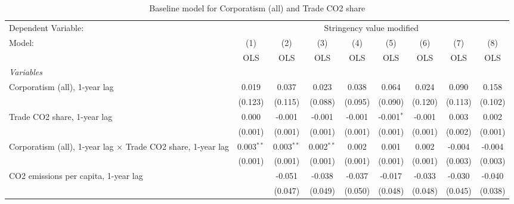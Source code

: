 
\begin{table}[htbp]
   \caption{Baseline model for Corporatism (all) and Trade CO2 share}
   \centering
   \begin{tabular}{lcccccccc}
      \toprule
      Dependent Variable: & \multicolumn{8}{c}{Stringency value modified}\\
      Model:                                                              & (1)          & (2)          & (3)          & (4)     & (5)          & (6)           & (7)           & (8)\\  
                                                                          &  OLS         & OLS          & OLS          & OLS     & OLS          & OLS           & OLS           & OLS\\  
      \midrule
      \emph{Variables}\\
      Corporatism (all), 1-year lag                                       & 0.019        & 0.037        & 0.023        & 0.038   & 0.064        & 0.024         & 0.090         & 0.158\\   
                                                                          & (0.123)      & (0.115)      & (0.088)      & (0.095) & (0.090)      & (0.120)       & (0.113)       & (0.102)\\   
      Trade CO2 share, 1-year lag                                         & 0.000        & -0.001       & -0.001       & -0.001  & -0.001$^{*}$ & -0.001        & 0.003         & 0.002\\   
                                                                          & (0.001)      & (0.001)      & (0.001)      & (0.001) & (0.001)      & (0.001)       & (0.002)       & (0.001)\\   
      Corporatism (all), 1-year lag $\times$ Trade CO2 share, 1-year lag  & 0.003$^{**}$ & 0.003$^{**}$ & 0.002$^{**}$ & 0.002   & 0.001        & 0.002         & -0.004        & -0.004\\   
                                                                          & (0.001)      & (0.001)      & (0.001)      & (0.001) & (0.001)      & (0.001)       & (0.003)       & (0.003)\\   
      CO2 emissions per capita, 1-year lag                                &              & -0.051       & -0.038       & -0.037  & -0.017       & -0.033        & -0.030        & -0.040\\   
                                                                          &              & (0.047)      & (0.049)      & (0.050) & (0.048)      & (0.048)       & (0.045)       & (0.038)\\   

\end{tabular}
\end{table}
